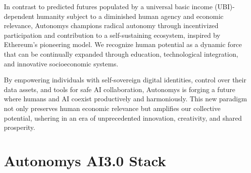 \documentclass[conference]{IEEEtran}
\begin{document}
In contrast to predicted futures populated by a universal basic income (UBI)-dependent humanity\cite{altman2021} subject to a diminished human agency and economic relevance, Autonomys champions radical autonomy through incentivized participation and contribution to a self-sustaining ecosystem, inspired by Ethereum's pioneering model. We recognize human potential as a dynamic force that can be continually expanded through education, technological integration, and innovative socioeconomic systems.

By empowering individuals with self-sovereign digital identities, control over their data assets, and tools for safe AI collaboration, Autonomys is forging a future where humans and AI coexist productively and harmoniously. This new paradigm not only preserves human economic relevance but amplifies our collective potential, ushering in an era of unprecedented innovation, creativity, and shared prosperity.

\section{Autonomys AI3.0 Stack}
\end{document}
